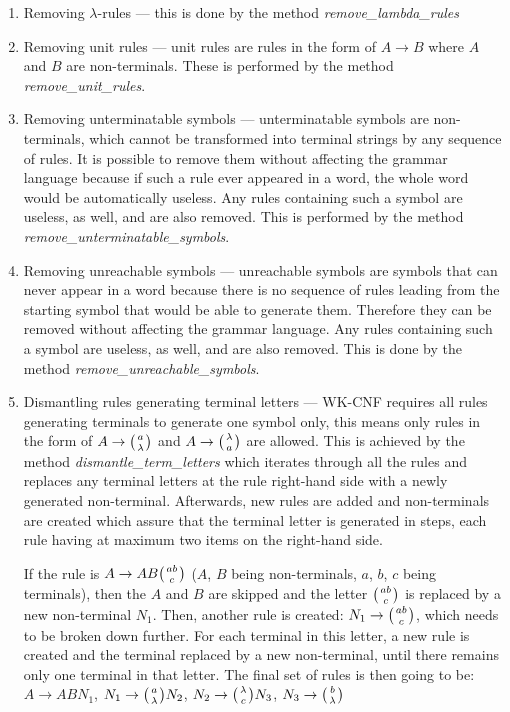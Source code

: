 \begin{enumerate}
  \item{Removing $\lambda$-rules --- this is done by the method \textit{remove\_lambda\_rules}}

  \item{Removing unit rules --- unit rules are rules in the form of $A \rightarrow B$ where $A$ and $B$ are non-terminals. These is performed by the method \textit{remove\_unit\_rules}.}

  \item{Removing unterminatable symbols --- unterminatable symbols are non-terminals, which cannot be transformed into terminal strings by any sequence of rules. It is possible to remove them without affecting the grammar language because if such a rule ever appeared in a word, the whole word would be automatically useless. Any rules containing such a symbol are useless, as well, and are also removed. This is performed by the method \textit{remove\_unterminatable\_symbols}.}

  \item{Removing unreachable symbols --- unreachable symbols are symbols that can never appear in a word because there is no sequence of rules leading from the starting symbol that would be able to generate them. Therefore they can be removed without affecting the grammar language. Any rules containing such a symbol are useless, as well, and are also removed. This is done by the method \textit{remove\_unreachable\_symbols}.}

  \item{Dismantling rules generating terminal letters --- WK-CNF requires all rules generating terminals to generate one symbol only, this means only rules in the form of $A \rightarrow \wkpair{a}{\lambda}$ and $A \rightarrow \wkpair{\lambda}{a}$ are allowed. This is achieved by the method \textit{dismantle\_term\_letters} which iterates through all the rules and replaces any terminal letters at the rule right-hand side with a newly generated non-terminal. Afterwards, new rules are added and non-terminals are created which assure that the terminal letter is generated in steps, each rule having at maximum two items on the right-hand side.

  If the rule is $A \rightarrow A B \wkpair{ab}{c}$ ($A$, $B$ being non-terminals, $a$, $b$, $c$ being terminals), then the $A$ and $B$ are skipped and the letter $\wkpair{ab}{c}$ is replaced by a new non-terminal $N_1$. Then, another rule is created: $N_1 \rightarrow \wkpair{ab}{c}$, which needs to be broken down further. For each terminal in this letter, a new rule is created and the terminal replaced by a new non-terminal, until there remains only one terminal in that letter. The final set of rules is then going to be: $A \rightarrow A B N_1$, $N_1 \rightarrow \wkpair{a}{\lambda} N_2$, $N_2 \rightarrow \wkpair{\lambda}{c} N_3$, $N_3 \rightarrow \wkpair{b}{\lambda}$}


\end{enumerate}
